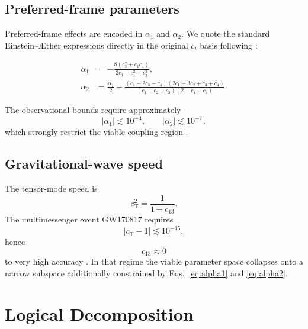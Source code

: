 \documentclass[12pt,a4paper]{article}
\newcommand{\AEther}{\AE{}ther}
\newcommand{\cT}{c_{\mathrm{T}}}
\begin{document}
        \subsection{Preferred-frame parameters}
            
            Preferred-frame effects are encoded in $\alpha_1$ and $\alpha_2$. We quote the
            standard Einstein--\AEther{} expressions directly in the original $c_i$ basis
            following \cite{foster2006}:

            \begin{align}
            \alpha_1 &=
            -\frac{8(c_3^2+c_1c_4)}{2c_1-c_1^2+c_3^2},
            \label{eq:alpha1}
            \\[6pt]
            \alpha_2 &=
            \frac{\alpha_1}{2}
            -\frac{(c_1+2c_3-c_4)(2c_1+3c_2+c_3+c_4)}
            {(c_1+c_2+c_3)(2-c_1-c_4)}.
            \label{eq:alpha2}
            \end{align}

            The observational bounds require approximately
            \begin{equation}
             |\alpha_1|\lesssim 10^{-4},
             \qquad
             |\alpha_2|\lesssim 10^{-7},
            \end{equation}
            which strongly restrict the viable coupling region \cite{will2014,jacobson2008}.

        \subsection{Gravitational-wave speed}
            
            The tensor-mode speed is
            \begin{equation}
                \cT^2 = \frac{1}{1-c_{13}}.
                \label{eq:cT}
            \end{equation}
            The multimessenger event GW170817 requires
            \begin{equation}
 |\cT-1|\lesssim 10^{-15},
\end{equation}
hence
\begin{equation}
 c_{13}\approx 0
 \label{eq:c13constraint}
\end{equation}
to very high accuracy \cite{abbott2017gw,abbott2017mm}. In that regime the
viable parameter space collapses onto a narrow subspace additionally constrained by Eqs.~\eqref{eq:alpha1} and \eqref{eq:alpha2}.

    
    \section{Logical Decomposition}
        \label{sec:logic}
        
\end{document}
